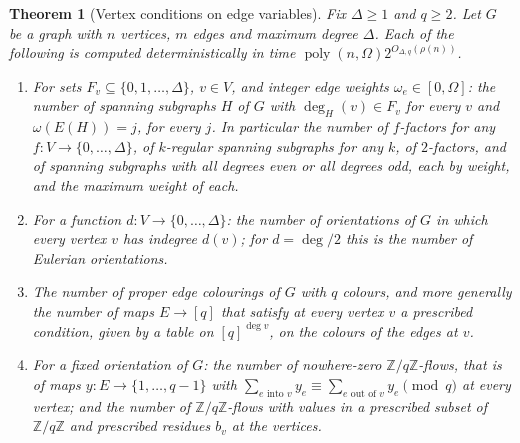 \documentclass[11pt,reqno]{amsart}
\numberwithin{equation}{section}
\theoremstyle{plain}
\newtheorem{theorem}{Theorem}[section]
\theoremstyle{definition}
\theoremstyle{remark}
\DeclareMathOperator{\poly}{poly}
\newcommand{\Z}{\mathbb{Z}}
\newcommand{\rhon}{\rho}
\begin{document}
\begin{theorem}[Vertex conditions on edge variables]\label{thm:edges}
Fix $\Delta\ge1$ and $q\ge2$. Let $G$ be a graph with $n$ vertices, $m$ edges and
maximum degree $\Delta$. Each of the following is computed deterministically in
time $\poly(n,\Omega)2^{O_{\Delta,q}(\rhon(n))}$.
\begin{enumerate}[label=\textup{(\roman*)},leftmargin=2.2em]
\item\label{it:factors} For sets $F_v\subseteq\{0,1,\dots,\Delta\}$, $v\in V$, and
integer edge weights $\omega_e\in[0,\Omega]$: the number of spanning subgraphs
$H$ of $G$ with $\deg_H(v)\in F_v$ for every $v$ and $\omega(E(H))=j$, for every
$j$. In particular the number of $f$-factors for any $f:V\to\{0,\dots,\Delta\}$,
of $k$-regular spanning subgraphs for any $k$, of $2$-factors, and of spanning
subgraphs with all degrees even or all degrees odd, each by weight, and the
maximum weight of each.
\item\label{it:orient} For a function $d:V\to\{0,\dots,\Delta\}$: the number of
orientations of $G$ in which every vertex $v$ has indegree $d(v)$; for
$d=\deg/2$ this is the number of Eulerian orientations.
\item\label{it:edgecol} The number of proper edge colourings of $G$ with $q$
colours, and more generally the number of maps $E\to[q]$ that satisfy at every
vertex $v$ a prescribed condition, given by a table on $[q]^{\deg v}$, on the
colours of the edges at $v$.
\item\label{it:flows} For a fixed orientation of $G$: the number of nowhere-zero
$\Z/q\Z$-flows, that is of maps $y:E\to\{1,\dots,q-1\}$ with
$\sum_{e\text{ into }v}y_e\equiv\sum_{e\text{ out of }v}y_e\pmod q$ at every
vertex; and the number of $\Z/q\Z$-flows with values in a prescribed subset of
$\Z/q\Z$ and prescribed residues $b_v$ at the vertices.
\end{enumerate}
\end{theorem}
\end{document}
